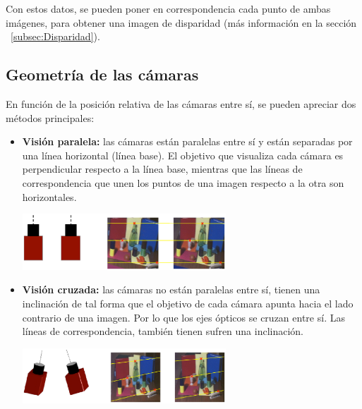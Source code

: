 Con estos datos, se pueden poner en correspondencia cada punto de ambas
imágenes, para obtener una imagen de disparidad (más información en la sección 
~\ref{subsec:Disparidad}).

\subsection{Geometría de las cámaras}
En función de la posición relativa de las cámaras entre sí, se pueden apreciar
dos métodos principales:

\begin{itemize}
  \item \textbf{Visión paralela:} las cámaras están paralelas entre sí y están
  separadas por una línea horizontal (línea base). El objetivo que visualiza
  cada cámara es perpendicular respecto a la línea base, mientras que las
  líneas de correspondencia que unen los puntos de una imagen respecto a la
  otra son horizontales.

  \begin{minipage}{\linewidth}
      \centering
      \includegraphics[width=0.6\textwidth]{images/cap2/VisionParalela.eps}
      \label{fig:VisionParalela}
  \end{minipage}

  \item \textbf{Visión cruzada:} las cámaras no están paralelas entre sí,
  tienen una inclinación de tal forma que el objetivo de cada cámara apunta
  hacia el lado contrario de una imagen. Por lo que los ejes ópticos se cruzan
  entre sí. Las líneas de correspondencia, también tienen sufren una
  inclinación.

  \begin{minipage}{\linewidth}
      \centering
      \includegraphics[width=0.6\textwidth]{images/cap2/VisionCruzada.eps}
      \label{fig:VisionCruzada}
  \end{minipage}
\end{itemize}

